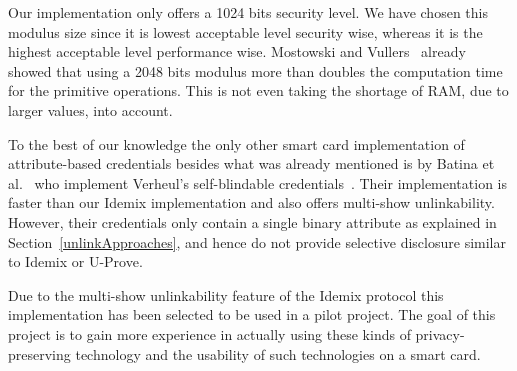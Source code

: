Our implementation only offers a 1024 bits security level. We have chosen this
modulus size since it is lowest acceptable level security wise, whereas it is
the highest acceptable level performance wise. Mostowski and
Vullers~\cite{MostowskiVullers11} already showed that using a 2048 bits modulus
more than doubles the computation time for the primitive operations. This is
not even taking the shortage of RAM, due to larger values, into account.

To the best of our knowledge the only other smart card implementation of
attribute-based credentials besides what was already mentioned is by Batina et
al.~\cite{BatinaHJMV10} who implement Verheul's self-blindable
credentials~\cite{Verheul01}. Their implementation is faster than our Idemix
implementation and also offers multi-show unlinkability. However, their
credentials only contain a single binary attribute as explained in
Section~\ref{unlinkApproaches}, and hence do not provide selective disclosure
similar to Idemix or U-Prove.

Due to the multi-show unlinkability feature of the Idemix protocol this
implementation has been selected to be used in a pilot project. The goal of this
project is to gain more experience in actually using these kinds of
privacy-preserving technology and the usability of such technologies on a smart
card.

